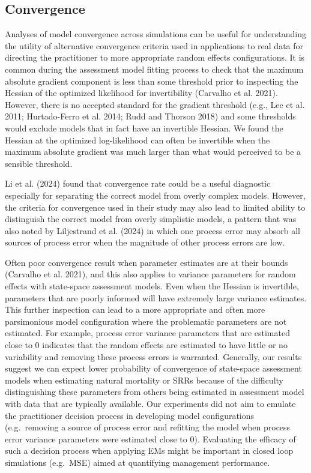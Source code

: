 \documentclass[
  12pt,
]{article}
\begin{document}
\hypertarget{convergence-1}{%
\subsection*{Convergence}\label{convergence-1}}

Analyses of model convergence across simulations can be useful for
understanding the utility of alternative convergence criteria used in
applications to real data for directing the practitioner to more
appropriate random effects configurations. It is common during the
assessment model fitting process to check that the maximum absolute
gradient component is less than some threshold prior to inspecting the
Hessian of the optimized likelihood for invertibility (Carvalho et al.
2021). However, there is no accepted standard for the gradient threshold
(e.g., Lee et al. 2011; Hurtado-Ferro et al. 2014; Rudd and Thorson
2018) and some thresholds would exclude models that in fact have an
invertible Hessian. We found the Hessian at the optimized log-likelihood
can often be invertible when the maximum absolute gradient was much
larger than what would perceived to be a sensible threshold.

Li et al. (2024) found that convergence rate could be a useful
diagnostic especially for separating the correct model from overly
complex models. However, the criteria for convergence used in their
study may also lead to limited ability to distinguish the correct model
from overly simplistic models, a pattern that was also noted by
Liljestrand et al. (2024) in which one process error may absorb all
sources of process error when the magnitude of other process errors are
low.

Often poor convergence result when parameter estimates are at their
bounds (Carvalho et al. 2021), and this also applies to variance
parameters for random effects with state-space assessment models. Even
when the Hessian is invertible, parameters that are poorly informed will
have extremely large variance estimates. This further inspection can
lead to a more appropriate and often more parsimonious model
configuration where the problematic parameters are not estimated. For
example, process error variance parameters that are estimated close to 0
indicates that the random effects are estimated to have little or no
variability and removing these process errors is warranted. Generally,
our results suggest we can expect lower probability of convergence of
state-space assessment models when estimating natural mortality or SRRs
because of the difficulty distinguishing these parameters from others
being estimated in assessment model with data that are typically
available. Our experiments did not aim to emulate the practitioner
decision process in developing model configurations (e.g.~removing a
source of process error and refitting the model when process error
variance parameters were estimated close to 0). Evaluating the efficacy
of such a decision process when applying EMs might be important in
closed loop simulations (e.g.~MSE) aimed at quantifying management
performance.
\end{document}
